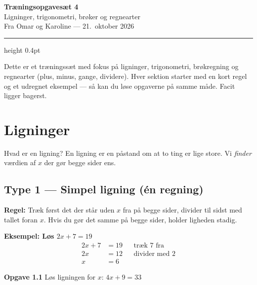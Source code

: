 \documentclass[11pt,a4paper]{article}
\title{}
\author{}
\date{}
\begin{document}
\begin{center}
  {\Large\bfseries Træningsopgavesæt 4}\\[2pt]
  {\color{inksoft}\large Ligninger, trigonometri, brøker og regnearter}\\[6pt]
  {\color{inksoft}\small Fra Omar og Karoline --- 21.~oktober 2026}
\end{center}

\vspace{6pt}
\hrule height 0.4pt
\vspace{10pt}

\noindent
Dette er et træningssæt med fokus på ligninger, trigonometri, brøkregning
og regnearter (plus, minus, gange, dividere). Hver sektion starter med en
kort regel og et udregnet eksempel --- så kan du løse opgaverne på samme
måde. Facit ligger bagerst.

\section{Ligninger}

\noindent
Hvad er en ligning? En ligning er en påstand om at to ting er lige store. Vi
\emph{finder} værdien af $x$ der gør begge sider ens.

\subsection*{Type 1 --- Simpel ligning (én regning)}

\begin{regelbox}
\textbf{Regel:} Træk først det der står uden $x$ fra på begge sider, divider
til sidst med tallet foran $x$. Hvis du gør det samme på begge sider, holder
ligheden stadig.
\end{regelbox}

\textbf{Eksempel: Løs $2x + 7 = 19$}
\begin{align*}
  2x + 7 &= 19 &&\text{træk $7$ fra}\\
  2x     &= 12 &&\text{divider med $2$}\\
  x      &= 6
\end{align*}

\begin{opgavebox}
\textbf{Opgave 1.1} \quad Løs ligningen for $x$: \quad $4x + 9 = 33$
\end{opgavebox}
\end{document}
